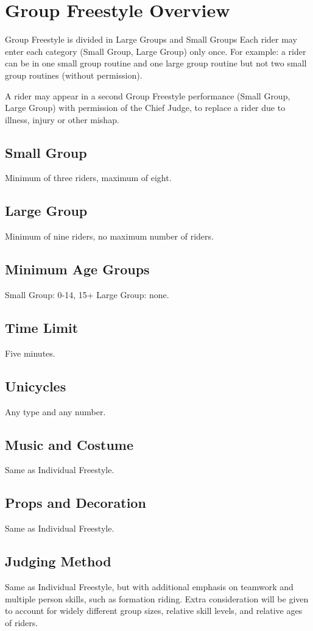 \section{Group Freestyle Overview}
Group Freestyle is divided in Large Groups and Small Groups 
Each rider may enter each category (Small Group, Large Group) only once. For example: a rider can be in one small group routine and one large group routine but not two small group routines (without permission).

A rider may appear in a second Group Freestyle performance (Small Group, Large Group) with permission of the Chief Judge, to replace a rider due to illness, injury or other mishap. 

\subsection{Small Group}
Minimum of three riders, maximum of eight.

\subsection{Large Group}
Minimum of nine riders, no maximum number of riders.

\subsection{Minimum Age Groups}
Small Group: 0-14, 15+
Large Group: none.

\subsection{Time Limit}
Five minutes.

\subsection{Unicycles}
Any type and any number.

\subsection{Music and Costume}
Same as Individual Freestyle.

\subsection{Props and Decoration}
Same as Individual Freestyle.

\subsection{Judging Method}
Same as Individual Freestyle, but with additional emphasis on teamwork and multiple person skills, such as formation riding.
Extra consideration will be given to account for widely different group sizes, relative skill levels, and relative ages of riders.

